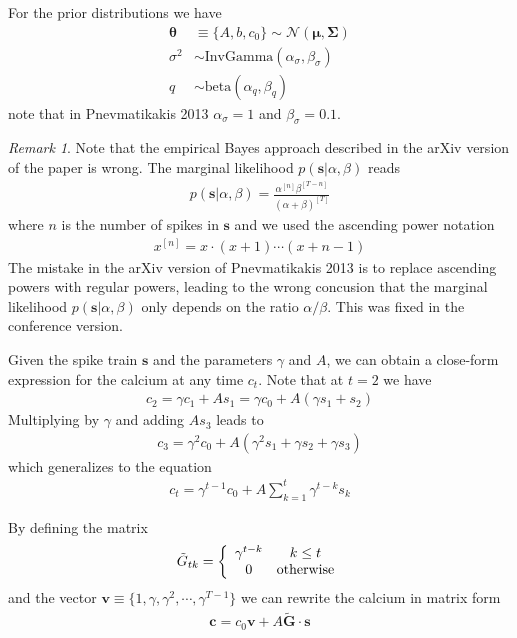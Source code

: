 \documentclass{article}
\theoremstyle{remark}
\newtheorem{remark}{Remark}
\begin{document}
For the prior distributions we have
\begin{align}
    \bm{\theta}&\equiv\lbrace A,b,c_0\rbrace \sim \mathcal{N}(\bm{\mu},\bm{\Sigma})\\
    \sigma^2 &\sim \mathrm{InvGamma}(\alpha_\sigma,\beta_\sigma)\\
    q&\sim \mathrm{beta}(\alpha_q,\beta_q)
\end{align}
note that in Pnevmatikakis 2013 $\alpha_\sigma=1$ and $\beta_\sigma=0.1$.
\begin{tcolorbox}
    \begin{remark}
Note that the empirical Bayes approach described in the arXiv version of the paper is wrong. 
The marginal likelihood $p(\bm{s}|\alpha,\beta)$ reads
\begin{align}
    p(\bm{s}|\alpha,\beta)=\frac{\alpha^{[n]}\beta^{[T-n]}}{(\alpha+\beta)^{[T]}}
\end{align}
where $n$ is the number of spikes in $\bm{s}$ and we used the ascending power notation
\begin{align}
    x^{[n]} = x\cdot (x+1)\cdots (x+n-1)
\end{align}
The mistake in the arXiv version of Pnevmatikakis 2013 is to replace ascending powers with regular powers, leading to the wrong concusion that the marginal likelihood $p(\bm{s}|\alpha,\beta)$ only depends on the ratio $\alpha/\beta$. This was fixed in the conference version.
    \end{remark}
\end{tcolorbox}
Given the spike train $\bm{s}$ and the parameters $\gamma$ and $A$, we can obtain a close-form expression for the calcium at any time $c_t$. 
Note that at $t=2$ we have 
\begin{align}
    c_2=\gamma c_1 +As_1 = \gamma c_0 + A(\gamma s_1 + s_2)
\end{align}
Multiplying by $\gamma$ and adding $A s_3$ leads to
\begin{align}
    c_3=\gamma^2 c_0 + A(\gamma^2 s_1+\gamma s_2 +\gamma s_3)
\end{align}
which generalizes to the equation
\begin{align}
    c_t = \gamma^{t-1}c_0 + A\sum_{k=1}^{t} \gamma^{t-k}s_k
\end{align}

By defining the matrix
\begin{align}
    \tilde G_{tk} = \left\lbrace\begin{array}{c c}
        \gamma^{t-k} & k\le t\\
        0 & \mathrm{otherwise}
    \end{array}\right.
\end{align}
and the vector $\bm{v} \equiv \lbrace 1,\gamma,\gamma^2,\cdots,\gamma^{T-1}\rbrace$ 
we can rewrite the calcium in matrix form
\begin{align}
    \bm{c} = c_0 \bm{v} + A \bm{\tilde G}\cdot \bm{s}
\end{align}
\end{document}
